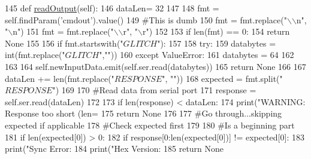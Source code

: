 \begin{DoxyCode}
145     \textcolor{keyword}{def }\hyperlink{classsoftware_1_1chipwhisperer_1_1capture_1_1targets_1_1SimpleSerial_1_1SimpleSerial_abafebe17ba785dc6042c17c9479be4d5}{readOutput}(self):
146         dataLen= 32
147 
148         fmt = self.findParam(\textcolor{stringliteral}{'cmdout'}).value()
149         \textcolor{comment}{#This is dumb}
150         fmt = fmt.replace(\textcolor{stringliteral}{"\(\backslash\)\(\backslash\)n"}, \textcolor{stringliteral}{"\(\backslash\)n"})
151         fmt = fmt.replace(\textcolor{stringliteral}{"\(\backslash\)\(\backslash\)}\textcolor{stringliteral}{r", "}\(\backslash\)r")
152 
153         \textcolor{keywordflow}{if} len(fmt) == 0:
154             \textcolor{keywordflow}{return} \textcolor{keywordtype}{None}
155 
156         \textcolor{keywordflow}{if} fmt.startswith(\textcolor{stringliteral}{"$GLITCH$"}):
157 
158             \textcolor{keywordflow}{try}:
159                 databytes = int(fmt.replace(\textcolor{stringliteral}{"$GLITCH$"},\textcolor{stringliteral}{""}))
160             \textcolor{keywordflow}{except} ValueError:
161                 databytes = 64
162 
163 
164             self.newInputData.emit(self.ser.read(databytes))
165             \textcolor{keywordflow}{return} \textcolor{keywordtype}{None}
166 
167         dataLen += len(fmt.replace(\textcolor{stringliteral}{"$RESPONSE$"}, \textcolor{stringliteral}{""}))
168         expected = fmt.split(\textcolor{stringliteral}{"$RESPONSE$"})
169 
170         \textcolor{comment}{#Read data from serial port}
171         response = self.ser.read(dataLen)
172 
173         \textcolor{keywordflow}{if} len(response) < dataLen:
174             print(\textcolor{stringliteral}{"WARNING: Response too short (len=%
175             \textcolor{keywordflow}{return} \textcolor{keywordtype}{None}
176 
177         \textcolor{comment}{#Go through...skipping expected if applicable}
178         \textcolor{comment}{#Check expected first}
179 
180         \textcolor{comment}{#Is a beginning part}
181         \textcolor{keywordflow}{if} len(expected[0]) > 0:
182             \textcolor{keywordflow}{if} response[0:len(expected[0])] != expected[0]:
183                 print(\textcolor{stringliteral}{"Sync Error: %
184                 print(\textcolor{stringliteral}{"Hex Version: %
185                 \textcolor{keywordflow}{return} \textcolor{keywordtype}{None}
}}}
\end{DoxyCode}
